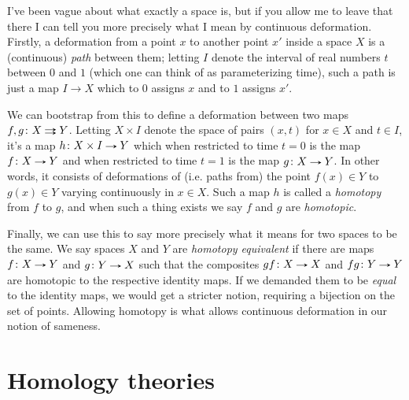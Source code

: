 \begin{nothing}[Homotopy]
  I've been vague about what exactly a space is, but if you allow me
  to leave that there I can tell you more precisely what I mean by
  continuous deformation. Firstly, a deformation from a point $x$ to
  another point $x'$ inside a space $X$ is a (continuous) \emph{path}
  between them; letting $I$ denote the interval of real numbers $t$
  between $0$ and $1$ (which one can think of as parameterizing time),
  such a path is just a map $I \to X$ which to $0$ assigns $x$ and to
  $1$ assigns $x'$.

  We can bootstrap from this to define a deformation between two maps
  $f,g \c X \doubto Y$. Letting $X \times I$ denote the space of pairs
  $(x,t)$ for $x \in X$ and $t \in I$, it's a map
  $h \c X \times I \to Y$ which when restricted to time $t=0$ is the
  map $f \c X \to Y$ and when restricted to time $t=1$ is the map
  $g \c X \to Y$. In other words, it consists of deformations of (i.e.
  paths from) the point $f(x) \in Y$ to $g(x) \in Y$ varying
  continuously in $x \in X$. Such a map $h$ is called a
  \emph{homotopy} from $f$ to $g$, and when such a thing exists we say
  $f$ and $g$ are \emph{homotopic}.

  Finally, we can use this to say more precisely what it means for two
  spaces to be the same. We say spaces $X$ and $Y$ are \emph{homotopy
    equivalent} if there are maps $f \c X \to Y$ and $g \c Y \to X$
  such that the composites $gf \c X \to X$ and $fg \c Y \to Y$ are
  homotopic to the respective identity maps. If we demanded them to be
  \emph{equal} to the identity maps, we would get a stricter notion,
  requiring a bijection on the set of points. Allowing homotopy is
  what allows continuous deformation in our notion of sameness.
\end{nothing}


\section{Homology theories}

